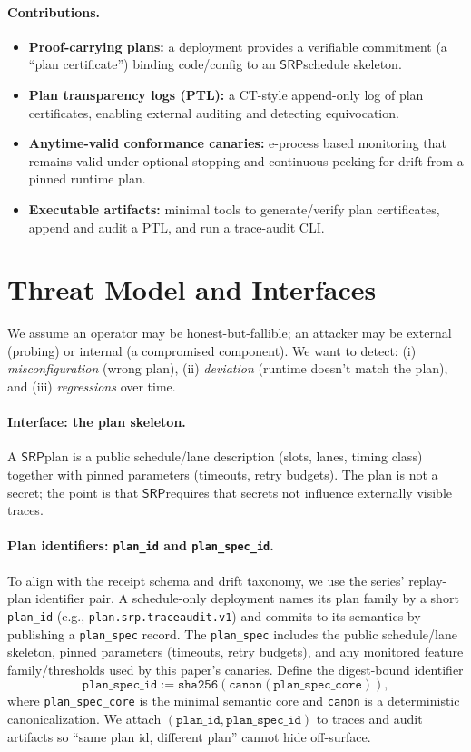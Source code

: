\documentclass[11pt]{article}
\newcommand{\SRP}{\ensuremath{\mathsf{SRP}}}
\begin{document}
\paragraph{Contributions.}
\begin{itemize}[leftmargin=*]
  \item \textbf{Proof-carrying plans:} a deployment provides a verifiable commitment (a ``plan certificate'') binding code/config to an \SRP schedule skeleton.
  \item \textbf{Plan transparency logs (PTL):} a CT-style append-only log of plan certificates, enabling external auditing and detecting equivocation.
  \item \textbf{Anytime-valid conformance canaries:} e-process based monitoring that remains valid under optional stopping and continuous peeking for drift from a pinned runtime plan.
  \item \textbf{Executable artifacts:} minimal tools to generate/verify plan certificates, append and audit a PTL, and run a trace-audit CLI.
\end{itemize}

\section{Threat Model and Interfaces}
We assume an operator may be honest-but-fallible; an attacker may be external (probing) or internal (a compromised component).
We want to detect:
(i) \emph{misconfiguration} (wrong plan),
(ii) \emph{deviation} (runtime doesn't match the plan), and
(iii) \emph{regressions} over time.

\paragraph{Interface: the plan skeleton.}
A \SRP plan is a public schedule/lane description (slots, lanes, timing class) together with pinned parameters (timeouts, retry budgets).
The plan is not a secret; the point is that \SRP requires that secrets not influence externally visible traces.

\paragraph{Plan identifiers: \texttt{plan\_id} and \texttt{plan\_spec\_id}.}
To align with the receipt schema and drift taxonomy, we use the series' replay-plan identifier pair.\cite{series:receiptitems,series:planstateequiv}
A schedule-only deployment names its plan family by a short \texttt{plan\_id} (e.g., \texttt{plan.srp.traceaudit.v1}) and commits to its semantics by publishing a \texttt{plan\_spec} record.
The \texttt{plan\_spec} includes the public schedule/lane skeleton, pinned parameters (timeouts, retry budgets), and any monitored feature family/thresholds used by this paper's canaries.
Define the digest-bound identifier
\[
\texttt{plan\_spec\_id} := \texttt{sha256}(\texttt{canon}(\texttt{plan\_spec\_core})),
\]
where \texttt{plan\_spec\_core} is the minimal semantic core and \texttt{canon} is a deterministic canonicalization.\cite{series:planstateequiv}
We attach $(\texttt{plan\_id},\texttt{plan\_spec\_id})$ to traces and audit artifacts so ``same plan id, different plan'' cannot hide off-surface.
\end{document}
